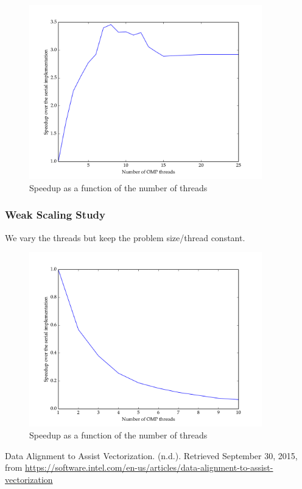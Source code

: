 \documentclass[11pt]{article}
\begin{document}
\begin{figure}[H]
    \includegraphics[width=0.9\textwidth]{./strong_scaling/strong_scaling.png}
    \caption{Speedup as a function of the number of threads}
    \label{fig:strong_scaling}
\end{figure} 


\subsubsection{Weak Scaling Study}

We vary the threads but keep the problem size/thread constant.
\begin{figure}[H]
    \includegraphics[width=0.9\textwidth]{./weak_scaling/weak_scaling.png}
    \caption{Speedup as a function of the number of threads}
    \label{fig:weak_scaling}
\end{figure} 



\begin{thebibliography}{9}
Data Alignment to Assist Vectorization. (n.d.). Retrieved September 30, 2015, from \url{https://software.intel.com/en-us/articles/data-alignment-to-assist-vectorization}

\end{thebibliography}

 
 
\end{document}

